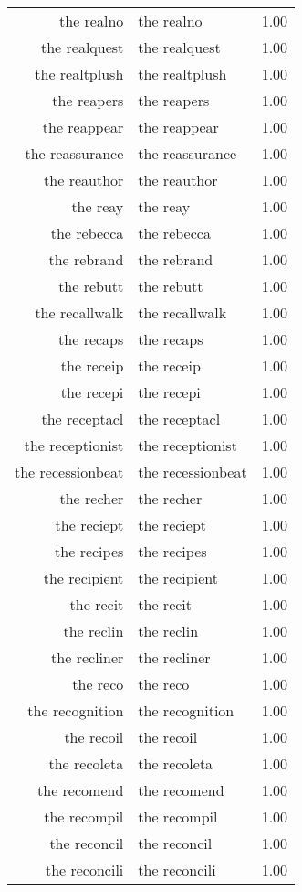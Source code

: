 \begin{table}[ht]
\begin{tabular}{rlr}
  the realno & the realno & 1.00 \\ 
  the realquest & the realquest & 1.00 \\ 
  the realtplush & the realtplush & 1.00 \\ 
  the reapers & the reapers & 1.00 \\ 
  the reappear & the reappear & 1.00 \\ 
  the reassurance & the reassurance & 1.00 \\ 
  the reauthor & the reauthor & 1.00 \\ 
  the reay & the reay & 1.00 \\ 
  the rebecca & the rebecca & 1.00 \\ 
  the rebrand & the rebrand & 1.00 \\ 
  the rebutt & the rebutt & 1.00 \\ 
  the recallwalk & the recallwalk & 1.00 \\ 
  the recaps & the recaps & 1.00 \\ 
  the receip & the receip & 1.00 \\ 
  the recepi & the recepi & 1.00 \\ 
  the receptacl & the receptacl & 1.00 \\ 
  the receptionist & the receptionist & 1.00 \\ 
  the recessionbeat & the recessionbeat & 1.00 \\ 
  the recher & the recher & 1.00 \\ 
  the reciept & the reciept & 1.00 \\ 
  the recipes & the recipes & 1.00 \\ 
  the recipient & the recipient & 1.00 \\ 
  the recit & the recit & 1.00 \\ 
  the reclin & the reclin & 1.00 \\ 
  the recliner & the recliner & 1.00 \\ 
  the reco & the reco & 1.00 \\ 
  the recognition & the recognition & 1.00 \\ 
  the recoil & the recoil & 1.00 \\ 
  the recoleta & the recoleta & 1.00 \\ 
  the recomend & the recomend & 1.00 \\ 
  the recompil & the recompil & 1.00 \\ 
  the reconcil & the reconcil & 1.00 \\ 
  the reconcili & the reconcili & 1.00 \\ 

\end{tabular}
\end{table}
